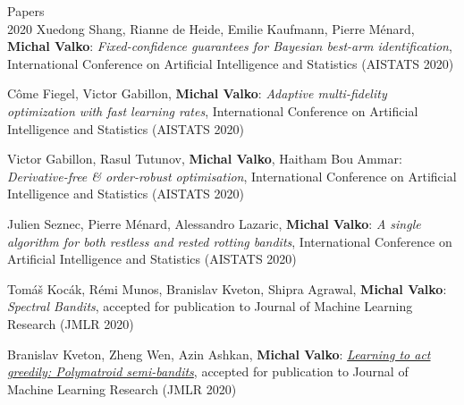 \documentclass{resume}
\begin{document}
\begin{category}{Papers\\2020}
\citembullet
Xuedong Shang, Rianne de Heide,  Emilie Kaufmann, Pierre M\'enard, {\bf Michal Valko}:
\emph{Fixed-confidence guarantees for Bayesian best-arm identification},
International Conference on Artificial Intelligence and Statistics
({\sf AISTATS 2020}) 

\citembullet
C\^ome Fiegel, Victor Gabillon, {\bf Michal Valko}:
\emph{Adaptive multi-fidelity optimization with fast learning rates},
International Conference on Artificial Intelligence and Statistics
({\sf AISTATS 2020}) 

\citembullet
Victor Gabillon, Rasul Tutunov, {\bf Michal Valko}, Haitham Bou Ammar:
\emph{Derivative-free \& order-robust optimisation},
International Conference on Artificial Intelligence and Statistics
({\sf AISTATS 2020}) 

\citembullet
Julien Seznec, Pierre M\'enard, Alessandro Lazaric, {\bf Michal Valko}:
\emph{A single algorithm for both restless and rested rotting bandits},
International Conference on Artificial Intelligence and Statistics
({\sf AISTATS 2020}) 

\citembullet
Tom\'a\v s Koc\' ak,  R\' emi Munos, Branislav Kveton, Shipra Agrawal, {\bf Michal Valko}:
\emph{Spectral Bandits},
accepted for publication to Journal of Machine Learning Research
({\sf JMLR 2020}) 

\citembullet
Branislav Kveton, Zheng Wen, Azin Ashkan, {\bf Michal Valko}:
\href{https://arxiv.org/pdf/1405.7752.pdf}
{\emph{Learning to act greedily: Polymatroid semi-bandits}},
accepted for publication to Journal of Machine Learning Research
({\sf JMLR 2020}) 
\end{category}
\end{document}
